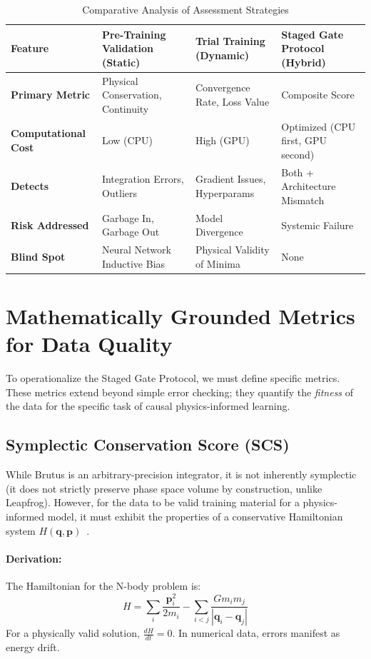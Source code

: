 \documentclass[11pt, a4paper]{article}
\newcommand{\vect}[1]{\mathbf{#1}} %
\begin{document}
\begin{table}[htbp]
\centering
\caption{Comparative Analysis of Assessment Strategies}
\label{tab:assessment_strategies}
\begin{tabular}{@{}p{}p{}p{}p{}@{}}
\toprule
\textbf{Feature} & \textbf{Pre-Training Validation (Static)} & \textbf{Trial Training (Dynamic)} & \textbf{Staged Gate Protocol (Hybrid)} \\ \midrule
\textbf{Primary Metric} & Physical Conservation, Continuity & Convergence Rate, Loss Value & Composite Score \\
\textbf{Computational Cost} & Low (CPU) & High (GPU) & Optimized (CPU first, GPU second) \\
\textbf{Detects} & Integration Errors, Outliers & Gradient Issues, Hyperparams & Both + Architecture Mismatch \\
\textbf{Risk Addressed} & Garbage In, Garbage Out & Model Divergence & Systemic Failure \\
\textbf{Blind Spot} & Neural Network Inductive Bias & Physical Validity of Minima & None \\ \bottomrule
\end{tabular}
\end{table}

\section{Mathematically Grounded Metrics for Data Quality}

To operationalize the Staged Gate Protocol, we must define specific metrics. These metrics extend beyond simple error checking; they quantify the \textit{fitness} of the data for the specific task of causal physics-informed learning.

\subsection{Symplectic Conservation Score (SCS)}

While Brutus is an arbitrary-precision integrator, it is not inherently symplectic (it does not strictly preserve phase space volume by construction, unlike Leapfrog). However, for the data to be valid training material for a physics-informed model, it must exhibit the properties of a conservative Hamiltonian system $H(\vect{q}, \vect{p})$~\cite{ref12}.

\paragraph{Derivation:}
The Hamiltonian for the N-body problem is:
\begin{equation}
    H = \sum_{i} \frac{\vect{p}_i^2}{2m_i} - \sum_{i < j} \frac{G m_i m_j}{|\vect{q}_i - \vect{q}_j|}
\end{equation}
For a physically valid solution, $\frac{dH}{dt} = 0$. In numerical data, errors manifest as energy drift.
\end{document}
